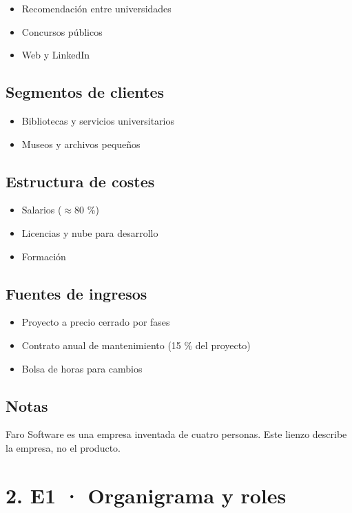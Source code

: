 \documentclass[11pt,a4paper]{article}
\begin{document}
\begin{itemize}
\item Recomendación entre universidades
\item Concursos públicos
\item Web y LinkedIn
\end{itemize}

\subsection*{Segmentos de clientes}

\begin{itemize}
\item Bibliotecas y servicios universitarios
\item Museos y archivos pequeños
\end{itemize}

\subsection*{Estructura de costes}

\begin{itemize}
\item Salarios ($\approx$80 \%)
\item Licencias y nube para desarrollo
\item Formación
\end{itemize}

\subsection*{Fuentes de ingresos}

\begin{itemize}
\item Proyecto a precio cerrado por fases
\item Contrato anual de mantenimiento (15 \% del proyecto)
\item Bolsa de horas para cambios
\end{itemize}

\subsection*{Notas}

Faro Software es una empresa inventada de cuatro personas. Este lienzo describe la empresa, no el producto.

\section*{2. E1 · Organigrama y roles}
\end{document}

